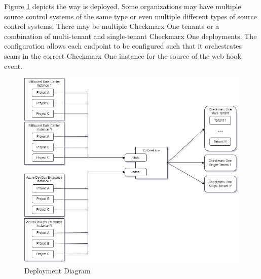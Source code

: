 Figure \ref{fig:cxoneflow-deployment} depicts the way \cxoneflow is deployed.  Some organizations may have
multiple source control systems of the same type or even multiple different types of source control systems.
There may be multiple Checkmarx One tenants or a combination of multi-tenant and single-tenant Checkmarx One
deployments.  The \cxoneflow configuration allows each endpoint to be configured such that it orchestrates
scans in the correct Checkmarx One instance for the source of the web hook event.

\begin{figure}[ht]
    \includegraphics[width=\textwidth]{graphics/cxoneflow-deployment.png}
    \caption{\cxoneflow Deployment Diagram}
    \label{fig:cxoneflow-deployment}
\end{figure}


